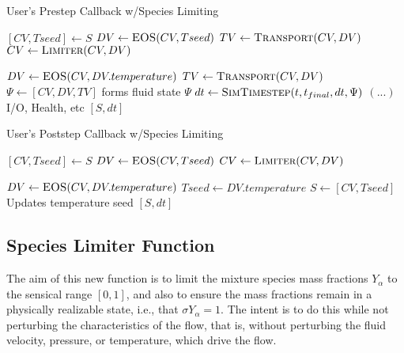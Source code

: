 \documentclass{article}
\begin{document}
%
\begin{algorithm}
  \caption{User's Prestep Callback w/Species Limiting}
  \begin{algorithmic}[1]
    \State $[CV, Tseed] \gets S$
    \State $DV \gets \Call{EOS}{CV, Tseed}$
    \State $TV \gets \Call{Transport}{CV, DV}$
    \State $CV \gets \Call{Limiter}{CV, DV}$
 
    \State $DV \gets \Call{EOS}{CV, DV.temperature}$
    \State $TV \gets \Call{Transport}{CV, DV}$    
    \State $\Psi \gets [CV, DV, TV]$ \Comment forms fluid state $\Psi$
    \State $dt \gets \Call{SimTimestep}{t, t_{final}, dt, \Psi}$
    \Statex $ ( ... )$ \Comment I/O, Health, etc
    \State \Return $[S, dt]$
    \EndProcedure  \end{algorithmic}
\end{algorithm}

%
\begin{algorithm}
  \caption{User's Poststep Callback w/Species Limiting}
  \begin{algorithmic}[1]
    \State $[CV, Tseed] \gets S$
    \State $DV \gets \Call{EOS}{CV, Tseed}$
    \State $CV \gets \Call{Limiter}{CV, DV}$

    \State $DV \gets \Call{EOS}{CV, DV.temperature}$
    \State $Tseed \gets DV.temperature$
    \State $S \gets [CV, Tseed]$ \Comment Updates temperature seed
    \State \Return $[S, dt]$
    \EndProcedure  \end{algorithmic}
\end{algorithm}

\subsection{Species Limiter Function}

The aim of this new function is to limit the mixture species mass fractions $Y_\alpha$ to the sensical range $[0, 1]$, and also to ensure the mass fractions remain in a physically realizable state, i.e., that $\sigma{Y_\alpha} = 1$.  The intent is to do this while not perturbing the characteristics of the flow, that is, without perturbing the fluid velocity, pressure, or temperature, which drive the flow.
\end{document}
